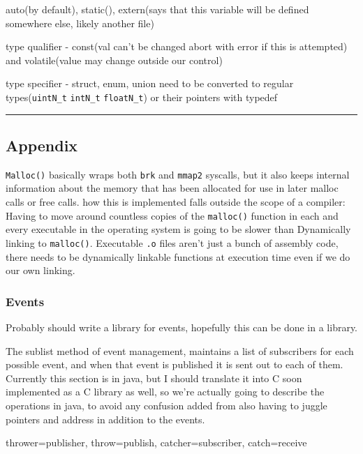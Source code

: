 auto(by default), static(), extern(says that this variable will be
defined somewhere else, likely another file)

type qualifier - const(val can't be changed abort with error if this is
attempted) and volatile(value may change outside our control)

type specifier - struct, enum, union need to be converted to regular
types(\texttt{uintN\_t} \texttt{intN\_t} \texttt{floatN\_t}) or their
pointers with typedef

\begin{center}\rule{0.5\linewidth}{0.5pt}\end{center}

\hypertarget{appendix}{%
\subsection{Appendix}\label{appendix}}

\texttt{Malloc()} basically wraps both \texttt{brk} and \texttt{mmap2}
syscalls, but it also keeps internal information about the memory that
has been allocated for use in later malloc calls or free calls. how this
is implemented falls outside the scope of a compiler: Having to move
around countless copies of the \texttt{malloc()} function in each and
every executable in the operating system is going to be slower than
Dynamically linking to \texttt{malloc()}. Executable \texttt{.o} files
aren't just a bunch of assembly code, there needs to be dynamically
linkable functions at execution time even if we do our own linking.

\hypertarget{events}{%
\subsubsection{Events}\label{events}}

Probably should write a library for events, hopefully this can be done
in a library.

The sublist method of event management, maintains a list of subscribers
for each possible event, and when that event is published it is sent out
to each of them. Currently this section is in java, but I should
translate it into C soon implemented as a C library as well, so we're
actually going to describe the operations in java, to avoid any
confusion added from also having to juggle pointers and address in
addition to the events.

thrower=publisher, throw=publish, catcher=subscriber, catch=receive

